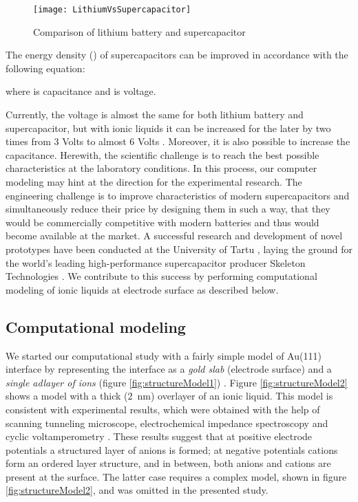 \documentclass[a4paper,10pt]{article}
\begin{document}
\begin{figure}
\centering
\texttt{[image: LithiumVsSupercapacitor]}
\caption{Comparison of lithium battery and supercapacitor}
\label{fig:LitVsSuperCap}
\end{figure}

The energy density () of supercapacitors can be improved in accordance with the following equation:



\noindent where  is capacitance and  is voltage.

Currently, the voltage is almost the same for both lithium battery and supercapacitor, but with ionic liquids it can be increased for the later by two times from 3 Volts to almost 6 Volts \cite{lewandowski2004}. Moreover, it is also possible to increase the capacitance. Herewith, the scientific challenge is to reach the best possible characteristics at the laboratory conditions. In this process, our computer modeling may hint at the direction for the experimental research. The engineering challenge is to improve characteristics of modern supercapacitors and simultaneously reduce their price by designing them in such a way, that they would be commercially competitive with modern batteries and thus would become available at the market. A successful research and development of novel prototypes have been conducted at the University of Tartu \cite{lust2003,kurig2011}, laying the ground for the world's leading high-performance supercapacitor producer Skeleton Technologies \cite{tartutech}. We contribute to this success by performing computational modeling of ionic liquids at electrode surface as described below.

\subsection{Computational modeling}



We started our computational study with a fairly simple model of Au(111) \textbar~ interface by representing the interface as a \textit{gold slab} (electrode surface) and a \textit{single adlayer of ions} (figure \ref{fig:structureModel1}) \cite{ivanistsev2012}. Figure \ref{fig:structureModel2} shows a model with a thick (2~nm) overlayer of an ionic liquid. This model is consistent with experimental results, which were obtained with the help of scanning tunneling microscope, electrochemical impedance spectroscopy and cyclic voltamperometry \cite{pan2006,gnahm2010}. These results suggest that at positive electrode potentials a structured layer of anions is formed; at negative potentials cations form an ordered layer structure, and in between, both anions and cations are present at the surface. The latter case requires a complex model, shown in figure \ref{fig:structureModel2}, and was omitted in the presented study.
\end{document}
